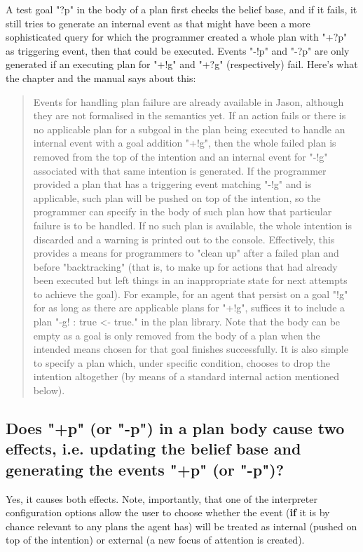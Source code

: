 \documentclass{article}
\begin{document}
\begin{description}
A test goal "?p" in the body of a plan first checks the belief base,
and if it fails, it still tries to generate an internal event as that
might have been a more sophisticated query for which the programmer
created a whole plan with "+?p" as triggering event, then that could
be executed. Events "-!p" and "-?p" are only generated if an executing
plan for "+!g" and "+?g" (respectively) fail. Here's what the chapter
and the manual says about this:

\begin{quote}
  Events for handling plan failure are already available in Jason,
  although they are not formalised in the semantics yet. If an action
  fails or there is no applicable plan for a subgoal in the plan being
  executed to handle an internal event with a goal addition "+!g",
  then the whole failed plan is removed from the top of the intention
  and an internal event for "-!g" associated with that same intention
  is generated. If the programmer provided a plan that has a
  triggering event matching "-!g" and is applicable, such plan will be
  pushed on top of the intention, so the programmer can specify in the
  body of such plan how that particular failure is to be handled. If
  no such plan is available, the whole intention is discarded and a
  warning is printed out to the console. Effectively, this provides a
  means for programmers to "clean up" after a failed plan and before
  "backtracking" (that is, to make up for actions that had already
  been executed but left things in an inappropriate state for next
  attempts to achieve the goal). For example, for an agent that
  persist on a goal "!g" for as long as there are applicable plans for
  "+!g", suffices it to include a plan "-g! : true <- true." in the
  plan library. Note that the body can be empty as a goal is only
  removed from the body of a plan when the intended means chosen for
  that goal finishes successfully. It is also simple to specify a plan
  which, under specific condition, chooses to drop the intention
  altogether (by means of a standard internal action mentioned below).
\end{quote}

\subsection{Does "+p" (or "-p") in a plan body cause two effects,
  i.e. updating the belief base and generating the events "+p" (or "-p")?}

Yes, it causes both effects. Note, importantly, that one of the interpreter
configuration options allow the user to choose whether the event (\textbf{if}
it is by chance relevant to any plans the agent has) will be treated as
internal (pushed on top of the intention) or external (a new focus of
attention is created).


\end{description}
\end{document}
